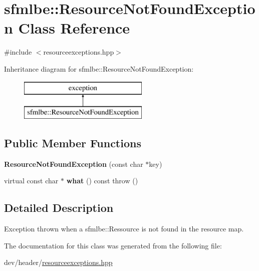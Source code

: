 \hypertarget{classsfmlbe_1_1_resource_not_found_exception}{}\section{sfmlbe\+:\+:Resource\+Not\+Found\+Exception Class Reference}
\label{classsfmlbe_1_1_resource_not_found_exception}


{\ttfamily \#include $<$resourceexceptions.\+hpp$>$}

Inheritance diagram for sfmlbe\+:\+:Resource\+Not\+Found\+Exception\+:\begin{figure}[H]
\begin{center}
\leavevmode
\includegraphics[height=2.000000cm]{classsfmlbe_1_1_resource_not_found_exception}
\end{center}
\end{figure}
\subsection*{Public Member Functions}
\begin{DoxyCompactItemize}
\item 
\mbox{\label{classsfmlbe_1_1_resource_not_found_exception_a1ee8f9376a6f12829aa99a215b0eedb9}} 
{\bfseries Resource\+Not\+Found\+Exception} (const char $\ast$key)
\item 
\mbox{\label{classsfmlbe_1_1_resource_not_found_exception_a9c7b4daf44b4054c4fcc4f9da223e0a9}} 
virtual const char $\ast$ {\bfseries what} () const  throw ()
\end{DoxyCompactItemize}


\subsection{Detailed Description}
Exception thrown when a sfmlbe\+::\+Ressource is not found in the resource map. 

The documentation for this class was generated from the following file\+:\begin{DoxyCompactItemize}
\item 
dev/header/\mbox{\hyperlink{resourceexceptions_8hpp}{resourceexceptions.\+hpp}}\end{DoxyCompactItemize}
